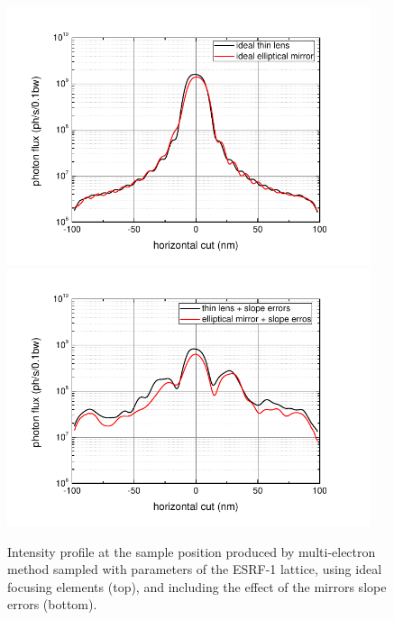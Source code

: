 \documentclass{iucr}              %
\begin{document}
\begin{figure}
    \centering
        \includegraphics[width=0.95\textwidth]{GRAPHICS/esrf_idealTE_idealOE_h.pdf}
        \includegraphics[width=0.95\textwidth]{GRAPHICS/esrf_slopeTE_slopeOE_h.pdf}
    \label{fig:FiniteEmittanceA}
    \caption{
    Intensity profile at the sample position produced by multi-electron method sampled with parameters of the ESRF-1 lattice, using ideal focusing elements (top), and including the effect of the mirrors slope errors (bottom).
    }
\end{figure}
\end{document}
